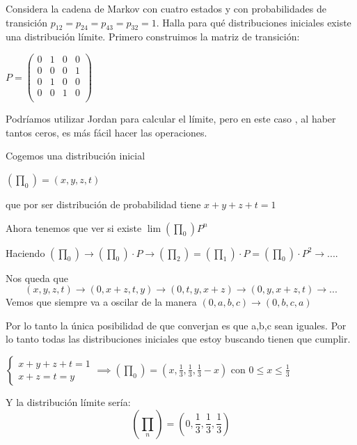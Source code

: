 \begin{problem}[2]
	Considera la cadena de Markov con cuatro estados y con probabilidades de transición
	$p_{12} = p_{24} = p_{43} = p_{32} = 1$. Halla para qué distribuciones iniciales existe una distribución
	límite.
	\solution
	Primero construimos la matriz de transición:

	$P = \left(\begin{matrix}
	0&1&0&0\\0&0&0&1\\0&1&0&0\\0&0&1&0\\
	\end{matrix}\right)$

	Podríamos utilizar Jordan para calcular el límite, pero en este caso , al haber tantos ceros, es más fácil hacer las operaciones.

	Cogemos una distribución inicial

	$(\prod_0)= (x,y,z,t)$

	que por ser distribución de probabilidad tiene $x+y+z+t=1$

	Ahora tenemos que ver si existe $\lim (\prod_0) P^n $

	Haciendo $(\prod_0) \rightarrow (\prod_0)\cdot P \rightarrow (\prod_2) = (\prod_1) \cdot P = (\prod_0)\cdot P^2 \rightarrow . . . . $

	Nos queda que
	$$(x,y,z,t) \rightarrow (0,x+z ,t,y) \rightarrow (0,t,y,x + z)\rightarrow(0,y,x+z,t) \rightarrow . . . $$
	Vemos que siempre va a oscilar de la manera $(0,a,b,c) \rightarrow (0,b ,c,a)$

	Por lo tanto la única posibilidad de que converjan es que a,b,c sean iguales. Por lo tanto todas las distribuciones iniciales que estoy buscando tienen que cumplir.

	$\begin{cases}
		 x + y + z + t = 1\\
		 x+z=t=y
	\end{cases} \implies (\prod_0) = (x,\frac{1}{3} , \frac{1}{3},\frac{1}{3} -x)$ con $0 \leq x \leq \frac{1}{3}$

	Y la distribución límite sería:
	$$(\prod_n) = (0, \frac{1}{3}, \frac{1}{3}, \frac{1}{3})$$
\end{problem}

